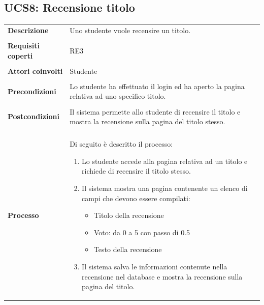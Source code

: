 \documentclass[10pt,a4paper]{report}
\begin{document}
	\subsection{UCS8: Recensione titolo}
	\begin{tabular}{lp{}}
		\textbf{Descrizione}&Uno studente vuole recensire un titolo.\\
		\\
		\textbf{Requisiti coperti}&RE3\\
		\\
		\textbf{Attori coinvolti}&Studente\\
		\\
		\textbf{Precondizioni}&Lo studente ha effettuato il login ed ha aperto la pagina relativa ad uno specifico titolo.\\
		\\
		\textbf{Postcondizioni}&Il sistema permette allo studente di recensire il titolo e mostra la recensione sulla pagina del titolo stesso.\\
		\\
		\textbf{Processo}&Di seguito è descritto il processo:
		\begin{enumerate}
			\item Lo studente accede alla pagina relativa ad un titolo e richiede di recensire il titolo stesso.
			\item Il sistema mostra una pagina contenente un elenco di campi che devono essere compilati:
			\begin{itemize}
				\item Titolo della recensione
				\item Voto: da 0 a 5 con passo di 0.5
				\item Testo della recensione
			\end{itemize}
			\item Il sistema salva le informazioni contenute nella recensione nel database e mostra la recensione sulla pagina del titolo.
		\end{enumerate}
	\end{tabular}

	
\end{document}

